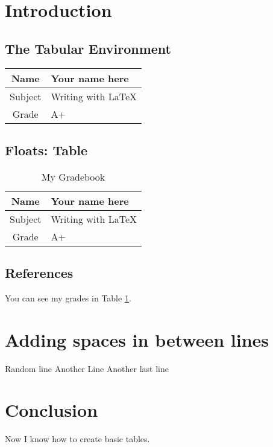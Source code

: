 \documentclass{article}
\title{}
\author{Aakash Pahuja}
\date{} %
\begin{document}
\maketitle

\section{Introduction}


\subsection{The Tabular Environment}

\begin{tabular}{|c|l|}
\hline
Name & Your name here \\
\hline
Subject & Writing with \LaTeX \\
\hline
Grade & A+ \\
\hline

\end{tabular}

\subsection{Floats: Table}

\begin{table}[htbp]  %

\caption{My Gradebook}

\begin{center}
\begin{tabular}{|c|l|}
\hline
Name & Your name here \\
\hline
Subject & Writing with \LaTeX \\
\hline
Grade & A+ \\
\hline

\end{tabular}
\end{center}
\label{tab:grades}
\end{table}


\subsection{References}

You can see my grades in Table \ref{tab:grades}.

\section{Adding spaces in between lines}
Random line
\smallskip %
Another Line
\bigskip %
Another last line

\section{Conclusion}

Now I know how to create basic tables.
\end{document}
